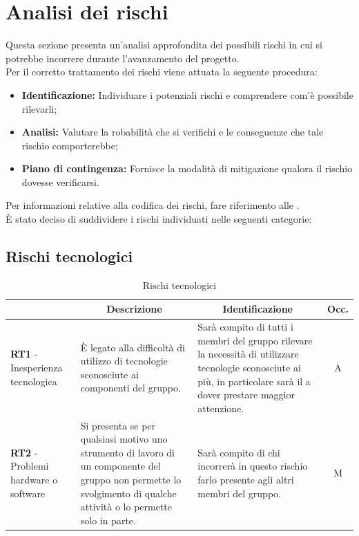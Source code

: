 \section{Analisi dei rischi} \label{section:analisi_dei_rischi}
Questa sezione presenta un'analisi approfondita dei possibili rischi in cui si potrebbe incorrere durante l'avanzamento del progetto.\\
Per il corretto trattamento dei rischi viene attuata la seguente procedura:
\begin{itemize}
  \item \textbf{Identificazione:} Individuare i potenziali rischi e comprendere com'è possibile rilevarli;
  \item \textbf{Analisi:} Valutare la robabilità che si verifichi e le conseguenze che tale rischio comporterebbe;
  \item \textbf{Piano di contingenza:} Fornisce la modalità di mitigazione qualora il rischio dovesse verificarsi.
\end{itemize}
Per informazioni relative alla codifica dei rischi, fare riferimento alle \docNameVersionNdP.\\
È stato deciso di suddividere i rischi individuati nelle seguenti categorie:

\subsection{Rischi tecnologici} \label{subsection:rischi_tecnologici}
\begin{table}[H]
  \centering
  \renewcommand{\arraystretch}{1.8}
  \begin{tabular}{p{5.5cm}|p{5cm}|p{5cm}|c}
    \rowcolor[HTML]{125E28} 
    \multicolumn{1}{c}{\color[HTML]{FFFFFF}\textbf{Codice}}
    & \multicolumn{1}{c}{\color[HTML]{FFFFFF}\textbf{Descrizione}}
    & \multicolumn{1}{c}{\color[HTML]{FFFFFF}\textbf{Identificazione}}
    & \color[HTML]{FFFFFF}\textbf{Occ.}\\
    \hline
    \textbf{RT1} - Inesperienza tecnologica & È legato alla difficoltà di utilizzo di tecnologie sconosciute ai componenti del gruppo. & Sarà compito di tutti i membri del gruppo rilevare la necessità di utilizzare tecnologie sconosciute ai più, in particolare sarà il \roleProjectManagerLow{} a dover prestare maggior attenzione. & A \\
    \textbf{RT2} - Problemi hardware o software & Si presenta se per qualsiasi motivo uno strumento di lavoro di un componente del gruppo non permette lo svolgimento di qualche attività o lo permette solo in parte. &  Sarà compito di chi incorrerà in questo rischio farlo presente agli altri membri del gruppo. & M \\
  \end{tabular}
  \caption{Rischi tecnologici}
\end{table}

